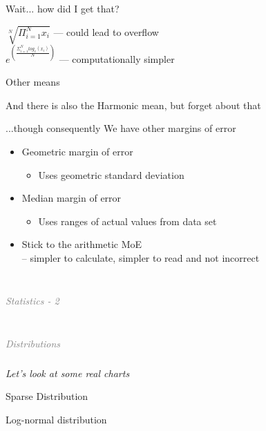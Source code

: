 \documentclass{beamer}
\newcommand{\innersplash}[1]{
  \begin{center}
    \Large \textrm{\textit{ #1 } }
  \end{center}
}
\newcommand{\splashslide}[2][{}]{
  \begin{frame}
  \frametitle{#1}
  \innersplash{#2}
  \end{frame}
}
\newcommand{\leadinslide}[2]{
  \splashslide{
     {\fontsize{150}{20}\selectfont{\raisebox{0pt}[90pt][0pt]{\textcolor{light-gray}{#1}}}} \\ \huge \textcolor{gray}{#2}
  }
}
\begin{document}
\begin{frame}{Wait... how did I get that?}
  \pause

  \begin{center}
  \Large{\( \sqrt[N]{\Pi^N_{i=1}x_i} \)}
  \pause
  --- could lead to overflow \\
  \medskip
  \pause
  \medskip
  \Large{ \( e^{ \left(\frac{\Sigma^N_{i=1} log_e(x_i)}{N}\right) } \)} 
  --- computationally simpler
  \end{center}
\end{frame}

\begin{frame}{Other means}
  \begin{center}
  And there is also the Harmonic mean, but forget about that
  \end{center}
\end{frame}

\begin{frame}{...though consequently}
We have other margins of error
  \begin{itemize}
  \item Geometric margin of error
    \begin{itemize}
    \item Uses geometric standard deviation
    \end{itemize}
  \item Median margin of error
    \begin{itemize}
    \item Uses ranges of actual values from data set
    \end{itemize}
  \item<2-> Stick to the arithmetic MoE \\ -- simpler to calculate, simpler to read and not incorrect
  \end{itemize}
\end{frame}

\leadinslide{2}{Statistics - 2}

\leadinslide{2-1}{Distributions}

\splashslide{Let's look at some real charts}

\begin{frame}{Sparse Distribution}
\end{frame}

\begin{frame}{Log-normal distribution}
\end{frame}
\end{document}
